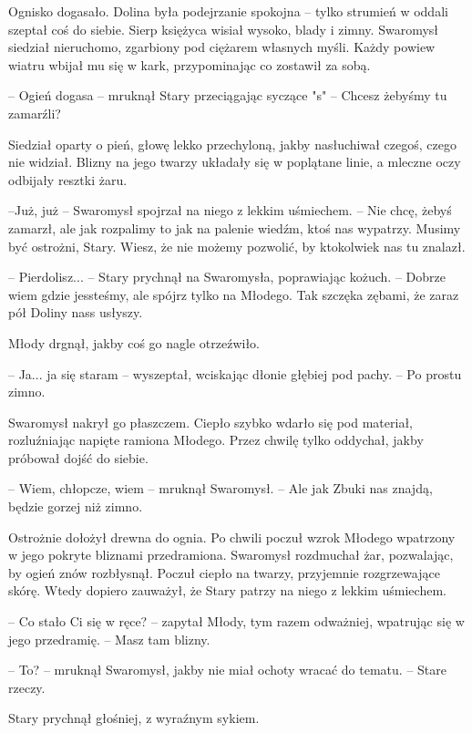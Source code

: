 \sloppy
\indent Ognisko dogasało. Dolina była podejrzanie spokojna -- tylko strumień w oddali szeptał coś do siebie. Sierp księżyca wisiał wysoko, blady i zimny. Swaromysł siedział nieruchomo, zgarbiony pod ciężarem własnych myśli. Każdy powiew wiatru wbijał mu się w kark, przypominając co zostawił za sobą.
\par\noindent-- Ogień dogasa -- mruknął Stary przeciągając syczące "s" -- Chcesz żebyśmy tu zamarźli?
\par\indent Siedział oparty o pień, głowę lekko przechyloną, jakby nasłuchiwał czegoś, czego nie widział. Blizny na jego twarzy układały się w poplątane linie, a mleczne oczy odbijały resztki żaru.
\par\noindent--Już, już -- Swaromysł spojrzał na niego z lekkim uśmiechem. -- Nie chcę, żebyś zamarzł, ale jak rozpalimy to jak na palenie wiedźm, ktoś nas wypatrzy. Musimy być ostrożni, Stary. Wiesz, że nie możemy pozwolić, by ktokolwiek nas tu znalazł.
\par\noindent -- Pierdolisz... -- Stary prychnął na Swaromysła, poprawiając kożuch. -- Dobrze wiem gdzie jessteśmy, ale spójrz tylko na Młodego. Tak szczęka zębami, że zaraz pół Doliny nass usłyszy.
\par\indent Młody drgnął, jakby coś go nagle otrzeźwiło.
\par\noindent-- Ja... ja się staram -- wyszeptał, wciskając dłonie głębiej pod pachy. -- Po prostu zimno.
\par\indent Swaromysł nakrył go płaszczem. Ciepło szybko wdarło się pod materiał, rozluźniając napięte ramiona Młodego. Przez chwilę tylko oddychał, jakby próbował dojść do siebie.
\par\noindent-- Wiem, chłopcze, wiem -- mruknął Swaromysł. -- Ale jak Zbuki nas znajdą, będzie gorzej niż zimno.
\par\indent Ostrożnie dołożył drewna do ognia. Po chwili poczuł wzrok Młodego wpatrzony w jego pokryte bliznami przedramiona. Swaromysł rozdmuchał żar, pozwalając, by ogień znów rozbłysnął. Poczuł ciepło na twarzy, przyjemnie rozgrzewające skórę. Wtedy dopiero zauważył, że Stary patrzy na niego z lekkim uśmiechem.
\par\noindent-- Co stało Ci się w ręce? -- zapytał Młody, tym razem odważniej, wpatrując się w jego przedramię. -- Masz tam blizny.
\par\noindent-- To? -- mruknął Swaromysł, jakby nie miał ochoty wracać do tematu. -- Stare rzeczy.
\par\indent Stary prychnął głośniej, z wyraźnym sykiem.
